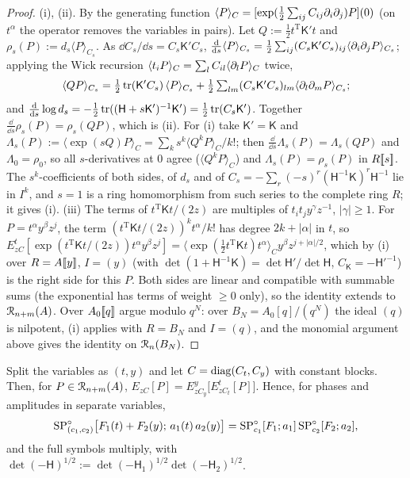 \begin{proof}
(i), (ii). By the generating function $\langle P\rangle_C=[\exp(\frac12\sum_{ij}C_{ij}\partial_i\partial_j)P](0)$ (on $t^\alpha$ the operator removes the variables in pairs). Let $Q:=\frac12t^{\mathrm T}\mathsf K't$ and $\rho_s(P):=d_s\langle P\rangle_{C_s}$. As $\dd C_s/\dd s=C_s\mathsf K'C_s$, $\frac{\mathrm{d}}{\mathrm{d} s}\langle P\rangle_{C_s}=\frac12\sum_{ij}(C_s\mathsf K'C_s)_{ij}\langle\partial_i\partial_jP\rangle_{C_s}$; applying the Wick recursion $\langle t_iP\rangle_C=\sum_lC_{il}\langle\partial_lP\rangle_C$ twice,
\[
\langle QP\rangle_{C_s}=\tfrac12\operatorname{tr}(\mathsf K'C_s)\,\langle P\rangle_{C_s}+\tfrac12\textstyle\sum_{lm}(C_s\mathsf K'C_s)_{lm}\langle\partial_l\partial_mP\rangle_{C_s};
\]
and $\frac{\mathrm{d}}{\mathrm{d} s}\log d_s=-\frac12\operatorname{tr}((\mathsf H+s\mathsf K')^{-1}\mathsf K')=\frac12\operatorname{tr}(C_s\mathsf K')$. Together $\frac{\dd}{\dd s}\rho_s(P)=\rho_s(QP)$, which is (ii). For (i) take $\mathsf K'=\mathsf K$ and $\Lambda_s(P):=\langle\exp(sQ)P\rangle_C=\sum_ks^k\langle Q^kP\rangle_C/k!$; then $\frac{\dd}{\dd s}\Lambda_s(P)=\Lambda_s(QP)$ and $\Lambda_0=\rho_0$, so all $s$-derivatives at $0$ agree ($\langle Q^kP\rangle_C$) and $\Lambda_s(P)=\rho_s(P)$ in $R[\![ s ]\!]$. The $s^k$-coefficients of both sides, of $d_s$ and of $C_s=-\sum_r(-s)^r(\mathsf H^{-1}\mathsf K)^r\mathsf H^{-1}$ lie in $I^k$, and $s=1$ is a ring homomorphism from such series to the complete ring $R$; it gives (i).
(iii) The terms of $t^{\mathrm T}\mathsf Kt/(2z)$ are multiples of $t_it_jy^\gamma z^{-1}$, $|\gamma|\geq1$. For $P=t^\alpha y^\beta z^j$, the term $(t^{\mathrm T}\mathsf Kt/(2z))^kt^\alpha/k!$ has degree $2k+|\alpha|$ in $t$, so $E^t_{zC}[\exp(t^{\mathrm T}\mathsf Kt/(2z))t^\alpha y^\beta z^j]=\langle\exp(\frac12t^{\mathrm T}\mathsf Kt)t^\alpha\rangle_Cy^\beta z^{j+|\alpha|/2}$, which by (i) over $R=A[\![ y ]\!]$, $I=(y)$ (with $\det(1+\mathsf H^{-1}\mathsf K)=\det\mathsf H'/\det\mathsf H$, $C_{\mathsf K}=-\mathsf H'^{-1}$) is the right side for this $P$. Both sides are linear and compatible with summable sums (the exponential has terms of weight $\geq0$ only), so the identity extends to $\mathcal{R}_{n+m}(A)$. Over $A_0[\![ q ]\!]$ argue modulo $q^N$: over $B_N=A_0[q]/(q^N)$ the ideal $(q)$ is nilpotent, (i) applies with $R=B_N$ and $I=(q)$, and the monomial argument above gives the identity on $\mathcal{R}_n(B_N)$.
\end{proof}

\begin{lem}[Products]
\label{lem:fsp-prod}
Split the variables as $(t,y)$ and let $C=\operatorname{diag}(C_t,C_y)$ with constant blocks. Then, for $P\in\mathcal{R}_{n+m}(A)$, $E_{zC}[P]=E^y_{zC_y}\bigl[E^t_{zC_t}[P]\bigr]$. Hence, for phases and amplitudes in separate variables,
\[
\mathrm{SP}^{\circ}_{(c_1,c_2)}\bigl[F_1(t)+F_2(y);\,a_1(t)\,a_2(y)\bigr]=\mathrm{SP}^{\circ}_{c_1}[F_1;a_1]\,\mathrm{SP}^{\circ}_{c_2}[F_2;a_2],
\]
and the full symbols multiply, with $\det(-\mathsf H)^{1/2}:=\det(-\mathsf H_1)^{1/2}\det(-\mathsf H_2)^{1/2}$.
\end{lem}

